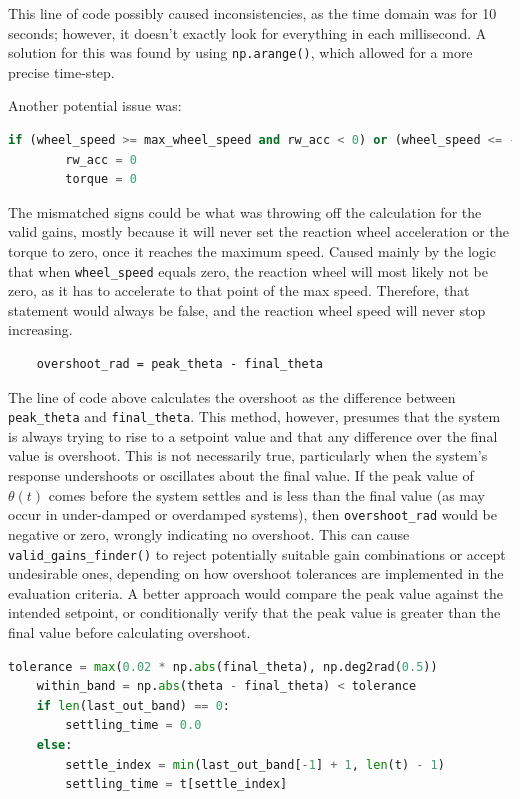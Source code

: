 \documentclass{ifacconf}
\begin{document}
This line of code possibly caused inconsistencies, as the time domain was for 10 seconds; however, it doesn't exactly look for everything in each millisecond. A solution for this was found by using \verb|np.arange()|, which allowed for a more precise time-step. 

Another potential issue was:

\begin{lstlisting}[language=Python]
    if (wheel_speed >= max_wheel_speed and rw_acc < 0) or (wheel_speed <= -max_wheel_speed and rw_acc > 0):
        rw_acc = 0
        torque = 0  
\end{lstlisting}

The mismatched signs could be what was throwing off the calculation for the valid gains, mostly because it will never set the reaction wheel acceleration or the torque to zero, once it reaches the maximum speed. Caused mainly by the logic that when \verb|wheel_speed| equals zero, the reaction wheel will most likely not be zero, as it has to accelerate to that point of the max speed. Therefore, that statement would always be false, and the reaction wheel speed will never stop increasing. 

\begin{verbatim}
    overshoot_rad = peak_theta - final_theta
\end{verbatim}

The line of code above calculates the overshoot as the difference between \texttt{peak\_theta} and \texttt{final\_theta}. This method, however, presumes that the system is always trying to rise to a setpoint value and that any difference over the final value is overshoot. This is not necessarily true, particularly when the system's response undershoots or oscillates about the final value. If the peak value of \( \theta(t) \) comes before the system settles and is less than the final value (as may occur in under-damped or overdamped systems), then \texttt{overshoot\_rad} would be negative or zero, wrongly indicating no overshoot. This can cause \texttt{valid\_gains\_finder()} to reject potentially suitable gain combinations or accept undesirable ones, depending on how overshoot tolerances are implemented in the evaluation criteria. A better approach would compare the peak value against the intended setpoint, or conditionally verify that the peak value is greater than the final value before calculating overshoot.



\begin{lstlisting}[language=Python]
    tolerance = max(0.02 * np.abs(final_theta), np.deg2rad(0.5))  
    within_band = np.abs(theta - final_theta) < tolerance 
    if len(last_out_band) == 0: 
        settling_time = 0.0
    else:
        settle_index = min(last_out_band[-1] + 1, len(t) - 1)
        settling_time = t[settle_index]
\end{lstlisting}
\end{document}
